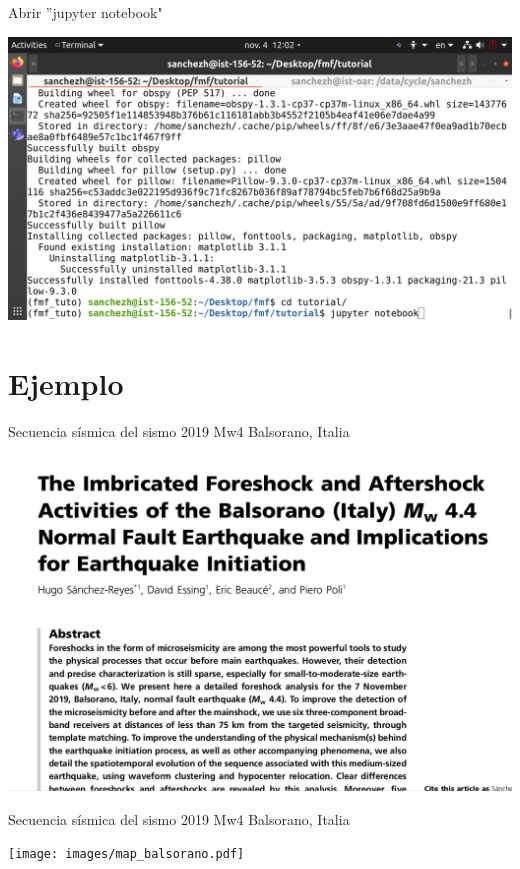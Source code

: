 \documentclass{beamer}
\begin{document}
\begin{frame}
 {Abrir ''jupyter notebook"}

 \centering
 \includegraphics[width=1\linewidth]{images/jupyter_notebook.png}
 
\end{frame}



\section{Ejemplo}

\begin{frame}
 {Secuencia s\'ismica del sismo 2019 Mw4 Balsorano, Italia}

 \begin{minipage}{1\linewidth}
  \centering \includegraphics[width=0.8\linewidth,angle=15]{images/paper.png}
 \end{minipage} 
 
\end{frame}



\begin{frame}
 {Secuencia s\'ismica del sismo 2019 Mw4 Balsorano, Italia}

 \begin{minipage}{1\linewidth}
  \centering \texttt{[image: images/map\_balsorano.pdf]}
 \end{minipage} 
 
\end{frame}
\end{document}
